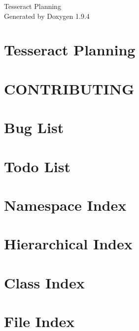 \documentclass[twoside]{book}
\newcommand{\+}{\discretionary{\mbox{\scriptsize$\hookleftarrow$}}{}{}}
\newcommand{\clearemptydoublepage}{%
    \newpage{\pagestyle{empty}\cleardoublepage}%
  }
\begin{document}
  \raggedbottom
    \hypersetup{pageanchor=false,
                bookmarksnumbered=true,
                pdfencoding=unicode
               }
  \begin{titlepage}
  \vspace*{7cm}
  \begin{center}%
  {\Large Tesseract Planning}\\
  \vspace*{1cm}
  {\large Generated by Doxygen 1.9.4}\\
  \end{center}
  \end{titlepage}
  \clearemptydoublepage
  \tableofcontents
  \clearemptydoublepage
  \hypersetup{pageanchor=true}
\chapter{Tesseract Planning}
\label{index}\hypertarget{index}{}
\chapter{CONTRIBUTING}
\label{md_CONTRIBUTING}

\chapter{Bug List}
\label{bug}

\chapter{Todo List}
\label{todo}

\chapter{Namespace Index}

\chapter{Hierarchical Index}

\chapter{Class Index}

\chapter{File Index}

\end{document}
